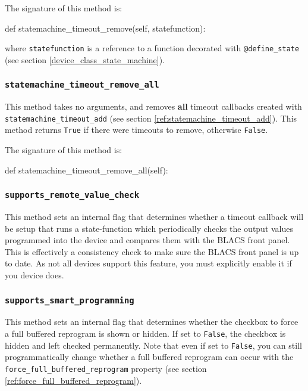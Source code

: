 \documentclass[12pt]{article}
\begin{document}
The signature of this method is:
\begin{python}
def statemachine_timeout_remove(self, statefunction):
\end{python}
where \texttt{statefunction} is a reference to a function decorated with \texttt{@define\_state} (see section \ref{device_class_state_machine}).

\subsubsection{\texttt{statemachine\_timeout\_remove\_all}}\label{ref:statemachine_timeout_remove_all}
This method takes no arguments, and removes \textbf{all} timeout callbacks created with \texttt{statemachine\_timeout\_add} (see section \ref{ref:statemachine_timeout_add}).
This method returns \texttt{True} if there were timeouts to remove, otherwise \texttt{False}.

The signature of this method is:
\begin{python}
def statemachine_timeout_remove_all(self):
\end{python}

\subsubsection{\texttt{supports\_remote\_value\_check}}\label{ref:supports_remote_value_check}
This method sets an internal flag that determines whether a timeout callback will be setup that runs a state-function which periodically checks the output values programmed into the device and compares them with the BLACS front panel.
This is effectively a consistency check to make sure the BLACS front panel is up to date.
As not all devices support this feature, you must explicitly enable it if you device does.



\subsubsection{\texttt{supports\_smart\_programming}}\label{ref:supports_smart_programming}
This method sets an internal flag that determines whether the checkbox to force a full buffered reprogram is shown or hidden.
If set to \texttt{False}, the checkbox is hidden and left checked permanently.
Note that even if set to \texttt{False}, you can still programmatically change whether a full buffered reprogram can occur with the \texttt{force\_full\_buffered\_reprogram} property (see section \ref{ref:force_full_buffered_reprogram}).
\end{document}
